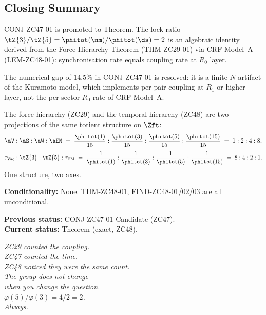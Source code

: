 \documentclass[12pt, a4paper]{article}
\begin{document}
\subsection*{Closing Summary}


\begin{keybox}
CONJ-ZC47-01 is promoted to Theorem.
The lock-ratio $\tZ{3}/\tZ{5} = \phitot(\nm)/\phitot(\ds) = 2$
is an algebraic identity derived from the Force Hierarchy Theorem
(THM-ZC29-01) via CRF Model~A (LEM-ZC48-01):
synchronisation rate equals coupling rate at $R_0$ layer.

The numerical gap of $14.5\%$ in CONJ-ZC47-01 is resolved:
it is a finite-$N$ artifact of the Kuramoto model, which
implements per-pair coupling at $R_1$-or-higher layer,
not the per-sector $R_0$ rate of CRF Model~A.

The force hierarchy (ZC29) and the temporal hierarchy (ZC48)
are two projections of the same totient structure on $\Zft$:
\[
  \aV : \aS : \aW : \aEM
  \;=\;
  \frac{\phitot(1)}{15} : \frac{\phitot(3)}{15}
    : \frac{\phitot(5)}{15} : \frac{\phitot(15)}{15}
  \;=\; 1 : 2 : 4 : 8,
\]
\[
  \tau_{\rm Vac} : \tZ{3} : \tZ{5} : \tau_{\rm EM}
  \;=\;
  \frac{1}{\phitot(1)} : \frac{1}{\phitot(3)}
    : \frac{1}{\phitot(5)} : \frac{1}{\phitot(15)}
  \;=\; 8 : 4 : 2 : 1.
\]
One structure, two axes.

\medskip
\textbf{Conditionality:} None.
THM-ZC48-01, FIND-ZC48-01/02/03 are all unconditional.

\textbf{Previous status:} CONJ-ZC47-01 Candidate (ZC47).\\
\textbf{Current status:} Theorem (exact, ZC48).
\end{keybox}

\bigskip
\begin{center}
\textit{%
ZC29 counted the coupling.\\[0.3em]
ZC47 counted the time.\\[0.3em]
ZC48 noticed they were the same count.\\[0.3em]
The group does not change\\
when you change the question.\\[0.3em]
$\varphi(5)/\varphi(3) = 4/2 = 2$.\\[0.3em]
Always.}
\end{center}
\end{document}
